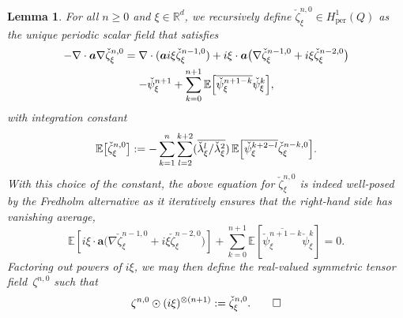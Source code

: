 \documentclass[10pt,a4paper]{article}
\theoremstyle{plain}
\newtheorem{lem0}[theor0]{Lemma}
\newenvironment{lem}
{\renewcommand{\qedsymbol}{$\lozenge$}\pushQED{\qed}\begin{lem0}}
{\popQED\end{lem0}}
\theoremstyle{definition}
\numberwithin{equation}{section}
\newcommand{\R}{\mathbb R}
\newcommand{\per}{{\operatorname{per}}}
\newcommand{\Aa}{\boldsymbol a}
\newcommand{\expec}[1]{\mathbb{E}\left[ #1 \right]}
\newcommand{\Bexpec}[1]{\mathbb{E}\Bigl[ #1 \Bigr]}
\newcommand{\expecm}[1]{\mathbb{E}\bigl[ #1 \bigr]}\let\bexpec\expecm
\begin{document}
\begin{lem}\label{lem:spec-corr-zeta-1}
For all $n\ge0$ and $\xi\in \R^d$, we recursively define $\check\zeta^{n,0}_\xi\in H^1_{{\per}}(Q)$ as the unique periodic scalar field that satisfies
\begin{multline}\label{e.zeta0n}
-\nabla\cdot\Aa\nabla\check \zeta^{n,0}_\xi=\nabla\cdot(\Aa i\xi\check\zeta^{n-1,0}_\xi)
+i\xi\cdot\Aa\big(\nabla\check\zeta^{n-1,0}_\xi+i\xi\check\zeta^{n-2,0}_\xi\big)\\
-\check\psi^{n+1}_\xi+\sum_{k=0}^{n+1}\Bexpec{\overline{\check\psi^{n+1-k}_\xi}\check\psi^k_\xi},
\end{multline}
with integration constant\vspace*{-3pt}
\begin{equation}\label{eq:expec-zeta}
\expecm{\check \zeta^{n,0}_\xi}:=-\sum_{k=1}^{n}\sum_{l=2}^{k+2}(\overline{\check \lambda_\xi^l/\check \lambda_\xi^2})\,\Bexpec{\overline{\check\psi^{k+2-l}_\xi}\check\zeta^{n-k,0}_\xi}.
\end{equation}
With this choice of the constant, the above equation for $\check\zeta^{n,0}_\xi$ is indeed well-posed by the Fredholm alternative as it iteratively ensures that the right-hand side has vanishing average,\vspace*{-3pt}
\begin{equation}\label{eq:chocolate}
\expec{i\xi\cdot\Aa\big(\nabla\check\zeta^{n-1,0}_\xi+i\xi\check\zeta^{n-2,0}_\xi\big)}+\sum_{k=0}^{n+1}\expec{\overline{\check\psi^{n+1-k}_\xi}\check\psi^k_\xi}=0.
\end{equation}
{Factoring out powers of $i\xi$,} we may then define the real-valued symmetric tensor field~$\zeta^{n,0}$ such that\vspace*{-3pt}
\[\zeta^{n,0} \odot (i\xi)^{\otimes (n+1)}:= \check\zeta^{n,0}_{\xi}.\qedhere\]
\end{lem}
\end{document}
